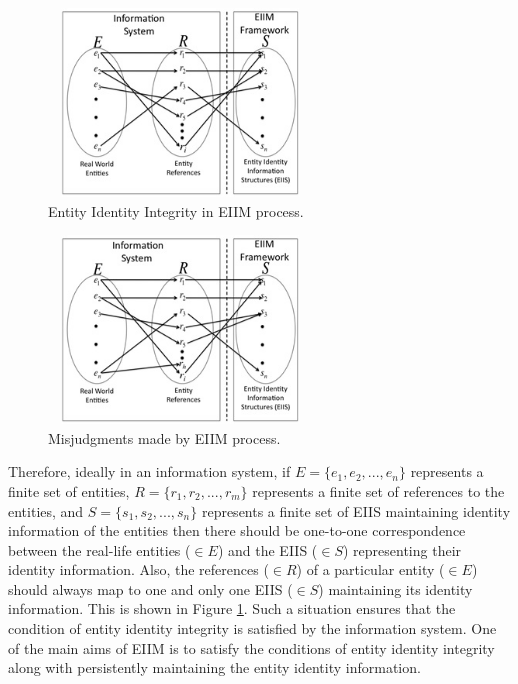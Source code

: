 \begin{figure}[htbp]
  \caption{Entity Identity Integrity in EIIM process.}
\label{identityIntegrity1}
  \centering
    \includegraphics[width=7cm,height=5cm]{Figures/identityIntegrityMDM1.jpg}
\end{figure}



\begin{figure}[htbp]
  \caption{Misjudgments made by EIIM process.}
\label{identityIntegrity2}
  \centering
    \includegraphics[width=7cm,height=5cm]{Figures/identityIntegrityMDM2.jpg}
\end{figure}


Therefore, ideally in an information system, if $E = \{e_{1},e_{2}, ... ,e_{n}\}$ represents a finite set of entities, $R = \{r_{1},r_{2}, ... ,r_{m}\}$ represents a finite set of references to the entities, and $S = \{s_{1},s_{2}, ... ,s_{n}\}$ represents a finite set of EIIS maintaining identity information of the entities then there should be one-to-one correspondence between the real-life entities ($\in E$) and the EIIS ($\in S$) representing their identity information. Also, the references ($\in R$) of a particular entity ($\in E$) should always map to one and only one EIIS ($\in S$) maintaining its identity information. This is shown in Figure \ref{identityIntegrity1}. Such a situation ensures that the condition of entity identity integrity is satisfied by the information system. One of the main aims of EIIM is to satisfy the conditions of entity identity integrity along with persistently maintaining the entity identity information.


